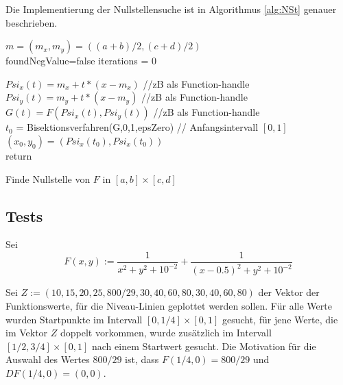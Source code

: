 \documentclass[a4paper,11pt,bibliography=totoc,listof=totoc,headinclude=true,cleardoublepage=empty,oneside]{scrartcl}
\begin{document}
Die Implementierung der Nullstellensuche ist in Algorithmus \ref{alg:NSt} genauer beschrieben.
\begin{algorithm}[ht]
	\label{alg:Nst}
	$m= (m_x,m_y) = ((a+b)/2,(c+d)/2)$ \\
	
	foundNegValue=false
	iterations = 0
	
	$Psi_x(t) = m_x + t*(x -m_x) $ //zB als Function-handle\\
	$Psi_y(t) = m_y + t*(x -m_y) $ //zB als Function-handle\\
	$G(t) = F(Psi_x(t),Psi_y(t)) $ //zB als Function-handle\\
	$t_0$ = Bisektionsverfahren(G,0,1,epsZero) // Anfangsintervall $[0,1]$\\
	$(x_0,y_0) = (Psi_x(t_0),Psi_x(t_0))$ \\
	return
	
	\caption{Finde Nullstelle von $F$ in $[a,b]\times[c,d]$}
\end{algorithm}
\subsection{Tests}
Sei %
\[
F(x,y) := \frac{1}{x^2+y^2+10^{-2}} + \frac{1}{(x-0.5)^2+y^2+10^{-2}}
\]

Sei $Z:= (10,15,20,25,800/29,30,40,60,80,30,40,60,80)$ der Vektor der Funktionswerte, für die Niveau-Linien geplottet werden sollen. Für alle Werte wurden Startpunkte im Intervall $[0,1/4]\times[0,1]$ gesucht, für jene Werte, die im Vektor $Z$ doppelt vorkommen, wurde zusätzlich im Intervall $[1/2,3/4]\times[0,1]$ nach einem Startwert gesucht. Die Motivation für die Auswahl des Wertes $800/29$ ist, dass $F(1/4,0)=800/29$ und $DF(1/4,0)=(0,0)$.
\end{document}
